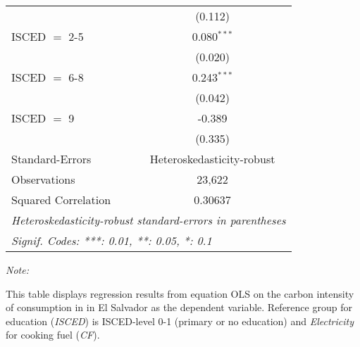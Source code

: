 \begin{table}[htbp!]
\begin{adjustbox}{width = 1\textwidth, max height = 0.95\textheight, center}
\begin{threeparttable}[b]
\begin{tabular}{lc}
                                & (0.112)\\   
            ISCED $=$ 2-5       & 0.080$^{***}$\\   
                                & (0.020)\\   
            ISCED $=$ 6-8       & 0.243$^{***}$\\   
                                & (0.042)\\   
            ISCED $=$ 9         & -0.389\\   
                                & (0.335)\\   
            \midrule 
            Standard-Errors     & Heteroskedasticity-robust \\   
            Observations        & 23,622\\  
            Squared Correlation & 0.30637\\  
            \midrule \midrule
            \multicolumn{2}{l}{\emph{Heteroskedasticity-robust standard-errors in parentheses}}\\
            \multicolumn{2}{l}{\emph{Signif. Codes: ***: 0.01, **: 0.05, *: 0.1}}\\
         \end{tabular}
         
         \begin{tablenotes}\item \medskip \textit{Note:}
            \item This table displays regression results from equation OLS on the carbon intensity of consumption in  in El Salvador as the dependent variable. Reference group for education (\textit{ISCED}) is ISCED-level 0-1 (primary or no education) and \textit{Electricity} for cooking fuel (\textit{CF}).
         \end{tablenotes}
      \end{threeparttable}
   \end{adjustbox}
\end{table}


